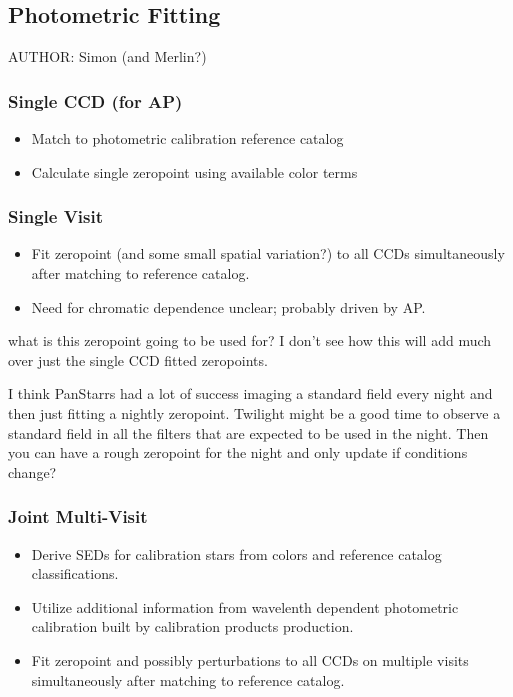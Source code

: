 \subsection{Photometric Fitting}
\label{sec:acPhotometricFitting}
AUTHOR: Simon (and Merlin?)
\subsubsection{Single CCD (for AP)}
\label{sec:acSingleCCDPhotometricFit}
\begin{itemize}
\item Match to photometric calibration reference catalog
\item Calculate single zeropoint using available color terms
\end{itemize}
\subsubsection{Single Visit}
\label{sec:acSingleVisitPhotometricFit}
\begin{itemize}
\item Fit zeropoint (and some small spatial variation?) to all CCDs simultaneously after matching to reference catalog.
\item Need for chromatic dependence unclear; probably driven by AP.
\end{itemize}

what is this zeropoint going to be used for?  I don't see how this will add much over just the single CCD fitted zeropoints.

I think PanStarrs had a lot of success imaging a standard field every night and then just fitting a nightly zeropoint.  Twilight might be a good time to observe a standard field in all the filters that are expected to be used in the night.  Then you can have a rough zeropoint for the night and only update if conditions change?


\subsubsection{Joint Multi-Visit}
\label{sec:acJointPhotometricFit}
\begin{itemize}
\item Derive SEDs for calibration stars from colors and reference catalog classifications.
\item Utilize additional information from wavelenth dependent photometric calibration built by calibration products production.
\item Fit zeropoint and possibly perturbations to all CCDs on multiple visits simultaneously after matching to reference catalog.
\end{itemize}

